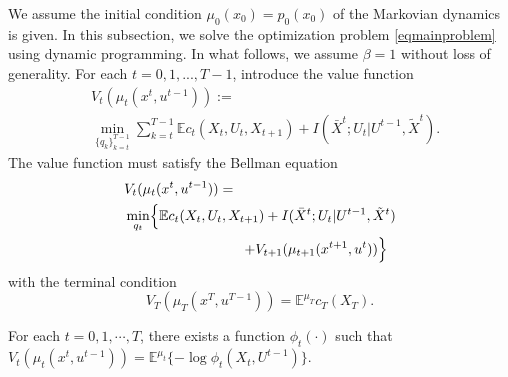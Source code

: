 We assume the initial condition $\mu_0(x_0)=p_0(x_0)$ of the Markovian dynamics is given. In this subsection, we solve the optimization problem \eqref{eqmainproblem} using dynamic programming. In what follows, we assume $\beta=1$ without loss of generality. For each $t=0, 1, ... , T-1$, introduce the value function
\begin{align*}
&V_t(\mu_t(x^t, u^{t-1})):= \\
& \min_{\{q_k\}_{k=t}^{T-1}} \sum_{k=t}^{T-1} \mathbb{E}c_t(X_t, U_t, X_{t+1})+I(\bar{X}^t; U_t|U^{t-1}, \tilde{X}^t).
\end{align*}
The value function must satisfy the Bellman equation
\begin{align}
&V_t(\mu_t(x^t, u^{t-1}))= \nonumber \\
&\min_{q_t} \Bigl\{ \mathbb{E}c_t(X_t, U_t, X_{t+1})+ I(\bar{X}^t; U_t|U^{t-1}, \tilde{X}^t) \Bigr. \nonumber \\
&\hspace{20ex}\Bigl. + V_{t+1}(\mu_{t+1}(x^{t+1}, u^t)) \Bigr\} \label{eqbellman}
\end{align}
with the terminal condition
\[
V_T(\mu_T(x^T, u^{T-1}))=\mathbb{E}^{\mu_T} c_T(X_T).
\]
\begin{lemma}\label{lemvalue}
For each $t=0, 1, \cdots , T$, there exists a function $\phi_t(\cdot)$ such that
$V_t(\mu_t(x^t, u^{t-1}))=\mathbb{E}^{\mu_t}\{-\log \phi_t(X_t, U^{t-1})\}$.
\end{lemma}
